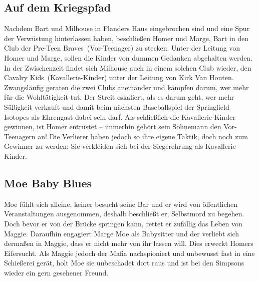\subsection{Auf dem Kriegspfad}\label{EABF16}
Nachdem Bart und Milhouse in Flanders Haus eingebrochen sind und eine Spur der Verwüstung hinterlassen haben, beschließen Homer und Marge, Bart in den Club der \glqq Pre-Teen Braves\grqq\ (Vor-Teenager) zu stecken. Unter der Leitung von Homer und Marge, sollen die Kinder von dummen Gedanken abgehalten werden. In der Zwischenzeit findet sich Milhouse auch in einem solchen Club wieder, den \glqq Cavalry Kids\grqq\ (Kavallerie-Kinder) unter der Leitung von Kirk Van Houten. Zwangsläufig geraten die zwei Clubs aneinander und kämpfen darum, wer mehr für die Wohltätigkeit tut. Der Streit eskaliert, als es darum geht, wer mehr Süßigkeit verkauft und damit beim nächsten Baseballspiel der Springfield Isotopes als Ehrengast dabei sein darf. Als schließlich die Kavallerie-Kinder gewinnen, ist Homer entrüstet -- immerhin gehört sein Sohnemann den Vor-Teenagern an! Die Verlierer haben jedoch so ihre eigene Taktik, doch noch zum Gewinner zu werden: Sie verkleiden sich bei der Siegerehrung als Kavallerie-Kinder. 


\subsection{Moe Baby Blues}
Moe fühlt sich alleine, keiner besucht seine Bar und er wird von öffentlichen Veranstaltungen ausgenommen, deshalb beschließt er, Selbstmord zu begehen. Doch bevor er von der Brücke springen kann, rettet er zufällig das Leben von Maggie. Daraufhin engagiert Marge Moe als Babysitter und der verliebt sich dermaßen in Maggie, dass er nicht mehr von ihr lassen will. Dies erweckt Homers Eifersucht. Als Maggie jedoch der Mafia nachspioniert und unbewusst fast in eine Schießerei gerät, holt Moe sie unbeschadet dort raus und ist bei den Simpsons wieder ein gern gesehener Freund.

